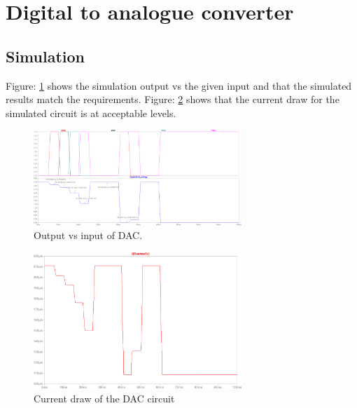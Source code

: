 \clearpage
\section{Digital to analogue converter}
\subsection{Simulation}
Figure: \ref{fig:dac_sim_out} shows the simulation output vs the given input and that the simulated results match the requirements. Figure: \ref{fig:dac_sim_cur} shows that the current draw for the simulated circuit is at acceptable levels.  
\begin{figure}[H]
\centering
\includegraphics[width = 0.7\textwidth]{./Figures/DAC_Sim_Out.png}
\caption{Output vs input of DAC.}
\label{fig:dac_sim_out}
\end{figure}

\begin{figure}[H]
\centering
\includegraphics[width = 0.7\textwidth]{./Figures/DAC_Sim_Cur.png}
\caption{Current draw of the DAC circuit}
\label{fig:dac_sim_cur}
\end{figure}

\clearpage
